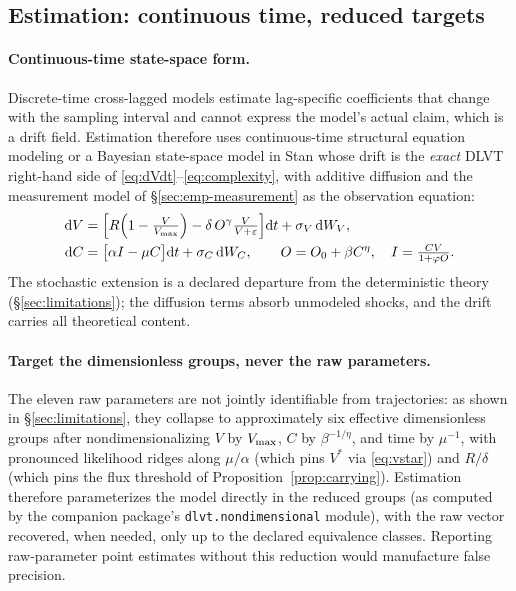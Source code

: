 \subsection{Estimation: continuous time, reduced targets}
\label{sec:emp-estimation}

\paragraph{Continuous-time state-space form.}
Discrete-time cross-lagged models estimate lag-specific coefficients that
change with the sampling interval and cannot express the model's actual
claim, which is a drift field. Estimation therefore uses continuous-time
structural equation modeling
\citep{voelkle2012ctsem,driver2017ctsem} or a Bayesian
state-space model in Stan \citep{carpenter2017stan} whose drift is the
\emph{exact} DLVT right-hand side of \eqref{eq:dVdt}--\eqref{eq:complexity}, with additive diffusion and
the measurement model of \S\ref{sec:emp-measurement} as the observation
equation:
\begin{align*}
\mathrm{d} V &= \Bigl[R\Bigl(1-\tfrac{V}{V_{\max}}\Bigr)
        -\delta\,O^{\gamma}\tfrac{V}{V+\varepsilon}\Bigr]\mathrm{d} t
        + \sigma_V\,\mathrm{d} W_V, \\
\mathrm{d} C &= \bigl[\alpha I - \mu C\bigr]\mathrm{d} t + \sigma_C\,\mathrm{d} W_C,
\qquad O=O_0+\beta C^{\eta},\quad I=\tfrac{CV}{1+\varphi O}.
\end{align*}
The stochastic extension is a declared departure from the deterministic
theory (\S\ref{sec:limitations}); the diffusion terms absorb unmodeled
shocks, and the drift carries all theoretical content.

\paragraph{Target the dimensionless groups, never the raw parameters.}
The eleven raw parameters are not jointly identifiable from trajectories:
as shown in \S\ref{sec:limitations}, they collapse to approximately six
effective dimensionless groups after nondimensionalizing $V$ by $V_{\max}$,
$C$ by $\beta^{-1/\eta}$, and time by $\mu^{-1}$, with pronounced likelihood
ridges along $\mu/\alpha$ (which pins $V^{*}$ via \eqref{eq:vstar}) and
$R/\delta$ (which pins the flux threshold of
Proposition~\ref{prop:carrying}). Estimation therefore parameterizes the
model directly in the reduced groups (as computed by the companion
package's \texttt{dlvt.nondimensional} module), with the raw vector
recovered, when needed, only up to the declared equivalence classes.
Reporting raw-parameter point estimates without this reduction would
manufacture false precision.

